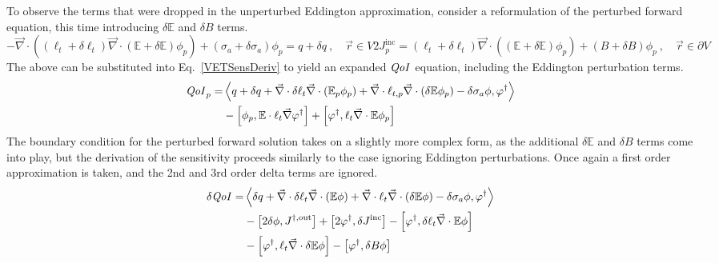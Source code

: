 \documentclass[12pt]{report}
\newcommand{\vr}{\vec{r}}
\newcommand{\bra}{\left\langle}
\newcommand{\ket}{\right\rangle}
\newcommand{\sbra}{\left[}
\newcommand{\sket}{\right]}
\renewcommand{\div}{\vec{\nabla} \cdot}
\newcommand{\grad}{\vec{\nabla}}
\newcommand{\vefadj}{\varphi^\dag}
\newcommand{\Edd}{\mathbb{E}}
\newcommand{\BEdd}{B}
\newcommand{\siga}{\sigma_a}
\newcommand{\isigt}{\ell_t}
\newcommand{\scalSource}{q}
\newcommand{\qoi}{{\it QoI}\xspace}
\begin{document}
To observe the terms that were dropped in the unperturbed Eddington approximation, consider a reformulation of the perturbed forward equation, this time introducing $\delta \Edd$ and $\delta  B$ terms. 
\begin{subequations}
\begin{equation}
\label{VEFPerEdd}
- \div \left((\isigt + \delta \isigt)\div (\Edd + \delta \Edd) \phi_p \right) + (\siga + \delta \siga)\phi_p = \scalSource + \delta \scalSource \ , \quad \vr \in V
\end{equation}
\begin{equation}
2J_p^{\text{inc}} =
(\isigt + \delta \isigt) \vec{\nabla} \cdot \left((\Edd + \delta \Edd) \phi_p \right)  + (\BEdd +\delta \BEdd) \phi_p \ ,\quad \vr \in \partial V
\end{equation}
\end{subequations}
The above can be substituted into Eq.~\eqref{VETSensDeriv} to yield an expanded $\qoi$ equation, including the Eddington perturbation terms. 
\begin{equation}
\label{QoIVETAdjNoBCEdd}
\begin{split}
\qoi_p = & \bra \scalSource + \delta \scalSource + \div \delta \isigt \div \left( \Edd_p \phi_p \right) + \div \ell_{t,p} \div \left( \delta \Edd \phi_p \right) - \delta \siga \phi, \vefadj \ket \\
&- \sbra \phi_p, \Edd \cdot \isigt \grad \vefadj \sket 
+ \sbra \vefadj , \isigt \div \Edd \phi_p \sket
\end{split}
\end{equation}
The boundary condition for the perturbed forward solution takes on a slightly more complex form, as the additional $\delta \Edd$ and $\delta \BEdd$ terms come into play, but the derivation of the sensitivity proceeds similarly to the case ignoring Eddington perturbations. Once again a first order approximation is taken, and the 2nd and 3rd order delta terms are ignored.
\begin{equation}
\label{QoIVETAdjEdd}
\begin{split}
\delta \qoi =& \bra \delta \scalSource + \div \delta \isigt \div \left( \Edd \phi \right) + \div \isigt \div \left( \delta \Edd \phi \right) - \delta \siga \phi, \vefadj \ket \\
&- \sbra 2\delta \phi, J^{\dag, \text{out}} \sket  + \sbra 2 \vefadj, \delta J^{\text{inc}} \sket
- \sbra \vefadj, \delta \isigt \div \Edd \phi \sket
\\
&- \sbra  \vefadj ,\isigt \div \delta \Edd \phi \sket
- \sbra \vefadj, \delta \BEdd \phi \sket
\end{split}
\end{equation} 
\end{document}

